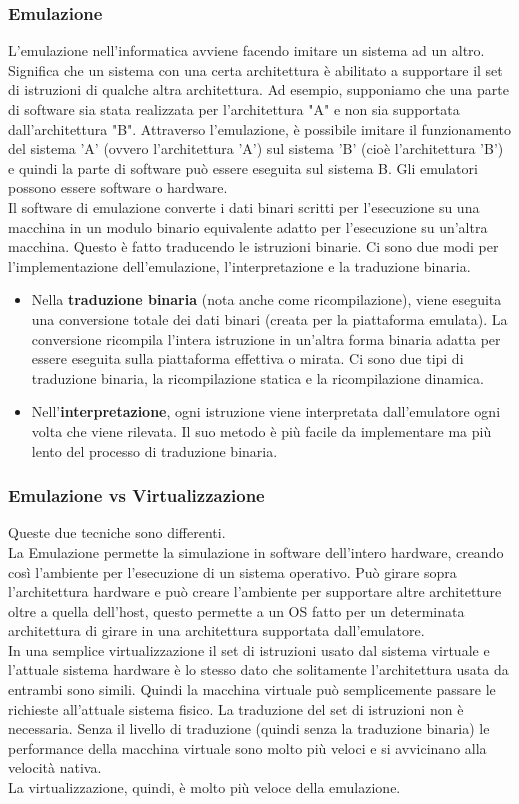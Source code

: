 \documentclass{article}
\begin{document}
\subsubsection{Emulazione}
L'emulazione nell'informatica avviene facendo imitare un sistema ad un altro. Significa che un sistema con una certa architettura è abilitato a supportare il set di istruzioni di qualche altra architettura. Ad esempio, supponiamo che una parte di software sia stata realizzata per l'architettura "A" e non sia supportata dall'architettura "B". Attraverso l'emulazione, è possibile imitare il funzionamento del sistema 'A' (ovvero l'architettura 'A') sul sistema 'B' (cioè l'architettura 'B') e quindi la parte di software può essere eseguita sul sistema B. Gli emulatori possono essere software o hardware. \\ 
Il software di emulazione converte i dati binari scritti per l'esecuzione su una macchina in un modulo binario equivalente adatto per l'esecuzione su un'altra macchina. Questo è fatto traducendo le istruzioni binarie. Ci sono due modi per l'implementazione dell’emulazione, l'interpretazione e la traduzione binaria. 
\begin{itemize}
    \item Nella \textbf{traduzione binaria} (nota anche come ricompilazione), viene eseguita una conversione totale dei dati binari (creata per la piattaforma emulata). La conversione ricompila l'intera istruzione in un'altra forma binaria adatta per essere eseguita sulla piattaforma effettiva o mirata. Ci sono due tipi di traduzione binaria, la ricompilazione statica e la ricompilazione dinamica.
    \item Nell'\textbf{interpretazione}, ogni istruzione viene interpretata dall'emulatore ogni volta che viene rilevata. Il suo metodo è più facile da implementare ma più lento del processo di traduzione binaria.
\end{itemize}

\subsubsection{Emulazione vs Virtualizzazione}
Queste due tecniche sono differenti. \\
La Emulazione permette la simulazione in software dell’intero hardware, creando così l’ambiente per l’esecuzione di un sistema operativo. Può girare sopra l’architettura hardware e può creare l’ambiente per supportare altre architetture oltre a quella dell’host, questo permette a un OS fatto per un determinata architettura di girare in una architettura supportata dall’emulatore. \\
In una semplice virtualizzazione il set di istruzioni usato dal sistema virtuale e l’attuale sistema hardware è lo stesso dato che solitamente l’architettura usata da entrambi sono simili. Quindi la macchina virtuale può semplicemente passare le richieste all’attuale sistema fisico. La traduzione del set di istruzioni non è necessaria. Senza il livello di traduzione (quindi senza la traduzione binaria) le performance della macchina virtuale sono molto più veloci e si avvicinano alla velocità nativa. \\
La virtualizzazione, quindi, è molto più veloce della emulazione. 
\end{document}
